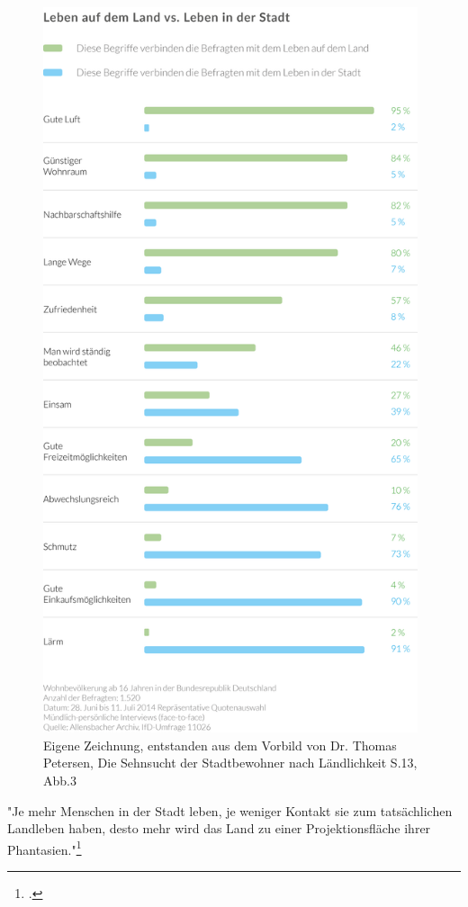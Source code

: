 \documentclass{scrartcl}
\begin{document}
\begin{figure}[htbp]
\centering
\includegraphics[width=11cm]{image_folder/SchaubildStadtVsLand_Umfrage.png}
\caption{Eigene Zeichnung, entstanden aus dem Vorbild von Dr. Thomas Petersen, Die Sehnsucht der Stadtbewohner nach Ländlichkeit S.13, Abb.3}
\label{fig:SchaubildStadtVsLandUmfrage}
\end{figure}

\begin{displayquote}
"Je mehr Menschen in der Stadt leben, je weniger Kontakt sie zum tatsächlichen Landleben haben, desto mehr wird das Land zu einer Projektionsfläche ihrer Phantasien."\footcite[S. 8]{Dr.ThomasPetersen2014DieLandlichkeit}
\end{displayquote}
\end{document}
